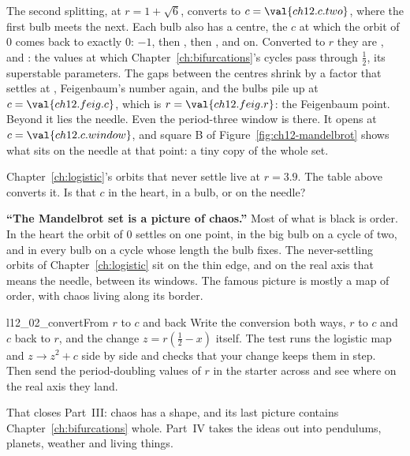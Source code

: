 \noindent
The second splitting, at $r = 1 + \sqrt{6}$, converts to
$c = \val{ch12.c.two}$, where the first bulb meets the next. Each bulb also
has a centre, the $c$ at which the orbit of $0$ comes back to exactly $0$:
$-1$, then , then , and on. Converted
to $r$ they are ,  and : the
values at which Chapter~\ref{ch:bifurcations}'s cycles pass through
$\tfrac12$, its superstable parameters. The gaps between the centres shrink
by a factor that settles at , Feigenbaum's number
again, and the bulbs pile up at $c = \val{ch12.feig.c}$, which is
$r = \val{ch12.feig.r}$: the Feigenbaum point. Beyond it lies the needle.
Even the period-three window is there. It opens at $c = \val{ch12.c.window}$,
and square B of Figure~\ref{fig:ch12-mandelbrot} shows what sits on the
needle at that point: a tiny copy of the whole set.

\begin{think}
Chapter~\ref{ch:logistic}'s orbits that never settle live at $r =
\num{3.9}$. The table above converts it. Is that $c$ in the heart, in a
bulb, or on the needle?
\end{think}

\begin{trapbox}
\textbf{\enquote{The Mandelbrot set is a picture of chaos.}} Most of what is
black is order. In the heart the orbit of $0$ settles on one point, in the
big bulb on a cycle of two, and in every bulb on a cycle whose length the
bulb fixes. The never-settling orbits of Chapter~\ref{ch:logistic} sit on
the thin edge, and on the real axis that means the needle, between its
windows. The famous picture is mostly a map of order, with chaos living
along its border.
\end{trapbox}

\begin{lab}{l12_02_convert}{From $r$ to $c$ and back}
Write the conversion both ways, $r$ to $c$ and $c$ back to $r$, and the
change $z = r(\tfrac12 - x)$ itself. The test runs the logistic map and
$z \to z^{2} + c$ side by side and checks that your change keeps them in
step. Then send the period-doubling values of $r$ in the starter across and
see where on the real axis they land.
\end{lab}

\noindent
That closes Part~III: chaos has a shape, and its last picture contains
Chapter~\ref{ch:bifurcations} whole. Part~IV takes the ideas out into
pendulums, planets, weather and living things.

